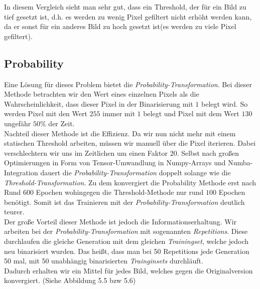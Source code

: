 In diesem Vergleich sieht man sehr gut, dass ein Threshold, der für ein Bild zu tief gesetzt ist, d.h. es werden zu wenig Pixel gefiltert nicht erhöht werden kann, da er sonst für ein anderes Bild zu hoch gesetzt ist(es werden zu viele Pixel gefiltert).\\

\subsection{Probability}

Eine Lösung für dieses Problem bietet die \textit{Probability-Transformation}. Bei dieser Methode betrachten wir den Wert eines einzelnen Pixels als die Wahrscheinlichkeit, dass dieser Pixel in der Binarisierung mit $1$ belegt wird. So werden Pixel mit den Wert $255$ immer mit $1$ belegt und Pixel mit dem Wert $130$ ungefähr $50\%$ der Zeit.\\

Nachteil dieser Methode ist die Effizienz. Da wir nun nicht mehr mit einem statischen Threshold arbeiten, müssen wir manuell über die Pixel iterieren. Dabei verschlechtern wir uns im Zeitlichen um einen Faktor $20$. Selbst nach großen Optimierungen in Form von Tensor-Umwandlung in Numpy-Arrays und Numba-Integration dauert die \textit{Probability-Transformation} doppelt solange wie die \textit{Threshold-Transformation}. Zu dem konvergiert die Probability Methode erst nach Rund $600$ Epochen wohingegen die Threshold-Methode nur rund $100$ Epochen benötigt. Somit ist das Trainieren mit der \textit{Probability-Transformation} deutlich teurer.\\

Der große Vorteil dieser Methode ist jedoch die Informationserhaltung. Wir arbeiten bei der \textit{Probability-Transformation} mit sogenannten \textit{Repetitions}. Diese durchlaufen die gleiche Generation mit dem gleichen \textit{Trainingset}, welche jedoch neu binarisiert wurden. Das heißt, dass man bei 50 Repetitions jede Generation 50 mal, mit 50 unabhängig binarisierten \textit{Trainginsets} durchläuft.\\Dadurch erhalten wir ein Mittel für jedes Bild, welches gegen die Originalversion konvergiert. (Siehe Abbildung 5.5 bzw 5.6)

